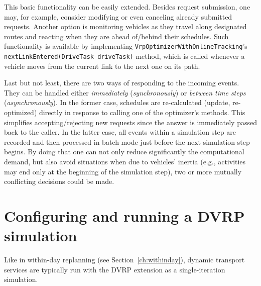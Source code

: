 This basic functionality can be easily extended. Besides request submission, one may, for example, consider modifying or even canceling already submitted requests. Another option is monitoring vehicles as they travel along designated routes and reacting when they are ahead of/behind their schedules. Such functionality is available by implementing \lstinline$VrpOptimizerWithOnlineTracking$'s \lstinline$nextLinkEntered(DriveTask driveTask)$ method, which is called whenever a vehicle moves from the current link to the next one on its path.

Last but not least, there are two ways of responding to the incoming events. They can be handled either \emph{immediately} (\emph{synchronously}) or \emph{between time steps} (\emph{asynchronously}). In the former case, schedules are re-calculated (update, re-optimized) directly in response to calling one of the optimizer's methods. This simplifies accepting/rejecting new requests since the answer is immediately passed back to the caller. In the latter case, all events within a simulation step are recorded and then processed in batch mode just before the next simulation step begins. By doing that one can not only reduce significantly the computational demand, but also avoid situations when due to vehicles' inertia (e.g., activities may end only at the beginning of the simulation step), two or more mutually conflicting decisions could be made.


\section{Configuring and running a DVRP simulation}

Like in within-day replanning (see Section~\ref{ch:withinday}), dynamic transport services are typically run with the DVRP extension as a single-iteration simulation.


